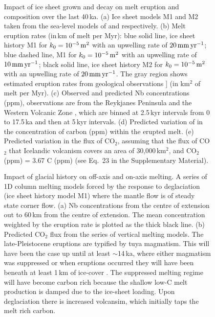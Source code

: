 \documentclass[draft,linenumbers]{agujournal2018}
\begin{document}
\begin{figure}
\caption{Impact of ice sheet grown and decay on melt eruption and composition over the last 40\,ka. (a) Ice sheet models M1 and M2 taken from the sea-level models of \citet{peltier-2004} and \citet{pico-etal-2017} respectively. (b) Melt eruption rates (in\,km of melt per Myr): blue solid line, ice sheet history M1 for $k_{0} = 10^{-5}\rm\,m^{2}$ with an upwelling rate of $20\rm\,mm\,yr^{-1}$; blue dashed line, M1 for $k_{0} = 10^{-5}\rm\,m^{2}$ with an upwelling rate of $10\rm\,mm\,yr^{-1}$; black solid line, ice sheet history M2 for $k_{0} = 10^{-5}\rm\,m^{2}$ with an upwelling rate of $20\rm\,mm\,yr^{-1}$. The gray region shows estimated eruption rates from geological observations \citep{maclennan-etal-2002}] (in km$^2$ of melt per Myr). (c) Observed and predicted Nb concentrations (ppm), observations are from the Reykjanes Peninsula and the Western Volcanic Zone \citep{gee-etal-1998,sinton-etal-2005,eason-etal-2015}, which are binned at 2.5\,kyr intervals from 0 to 17.5\,ka and then at 5\,kyr intervals. (d) Predicted variation of in the concentration of carbon (ppm) within the erupted melt. (e) Predicted variation in the flux of CO$_{2}$, assuming that the flux of CO$_{2}$ that Icelandic volcanism covers an area of 30,000\,km$^{2}$, and CO$_{2}$ (ppm) = 3.67 C (ppm) (see Eq.~23 in the Supplementary Material).}
\label{fg:5}
\end{figure}

\begin{figure}
\caption{Impact of glacial history on off-axis and on-axis melting. A series of 1D column melting models forced by the response to deglaciation (ice sheet history model M1) where the mantle flow is of steady state corner flow. (a) Nb concentrations from the centre of extension out to 60\,km from the centre of extension. The mean concentration weighted by the eruption rate is plotted as the thick black line. (b) Predicted CO$_{2}$ flux from the series of vertical melting models. The late-Pleistocene eruptions are typified by tuya magmatism. This will have been the case up until at least $\sim$14\,ka, where either magmatism was suppressed or when eruptions occurred they will have been beneath at least 1\,km of ice-cover \citep{hartley-etal-2016}. The suppressed melting regime will have become carbon rich because the shallow low-C melt production is damped due to the ice-sheet loading. Upon deglaciation there is increased volcansim, which initially taps the melt rich carbon.}
\label{fg:6}
\end{figure}
\end{document}
